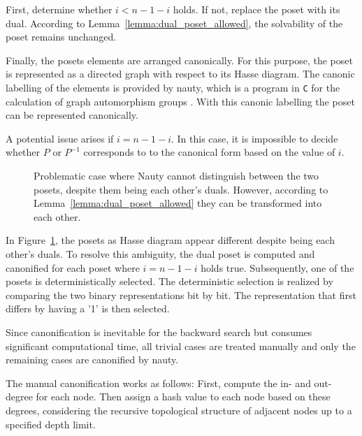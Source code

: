 \documentclass[10pt,journal,compsoc]{IEEEtran}
\begin{document}
First, determine whether $i < n - 1 - i$ holds.
If not, replace the poset with its dual.
According to Lemma~\ref{lemma:dual_poset_allowed}, the solvability of the poset remains unchanged.

Finally, the posets elements are arranged canonically.
For this purpose, the poset is represented as a directed graph with respect to its Hasse diagram.
The canonic labelling of the elements is provided by nauty, which is a program in \texttt{C} for the calculation of graph automorphism groups \cite[Practical Graph Isomorphism]{MCKAY201494}.
With this canonic labelling the poset can be represented canonically.

A potential issue arises if $i = n - 1 - i$.
In this case, it is impossible to decide whether $P$ or $P^{-1}$ corresponds to to the canonical form based on the value of $i$.

\begin{figure}[!b]
  \centering
  
  \caption{Problematic case where Nauty cannot distinguish between the two posets, despite them being each other's duals. However, according to Lemma~\ref{lemma:dual_poset_allowed} they can be transformed into each other.}
  \label{fig:backward_canonify_problematic}
\end{figure}

In Figure~\ref{fig:backward_canonify_problematic}, the posets as Hasse diagram appear different despite being each other's duals.
To resolve this ambiguity, the dual poset is computed and canonified for each poset where $i = n - 1 - i$ holds true.
Subsequently, one of the posets is deterministically selected.
The deterministic selection is realized by comparing the two binary representations bit by bit.
The representation that first differs by having a '1' is then selected.

Since canonification is inevitable for the backward search but consumes significant computational time, all trivial cases are treated manually and only the remaining cases are canonified by nauty.

The manual canonification works as follows:
First, compute the in- and out-degree for each node.
Then assign a hash value to each node based on these degrees, considering the recursive topological structure of adjacent nodes up to a specified depth limit.
\end{document}
